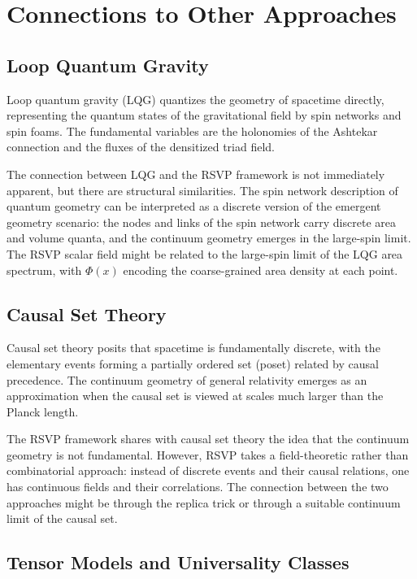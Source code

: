 \documentclass[12pt,a4paper,oneside]{book}
\theoremstyle{definition}
\theoremstyle{plain}
\theoremstyle{remark}
\begin{document}
\chapter{Connections to Other Approaches}

\section{Loop Quantum Gravity}

Loop quantum gravity (LQG) quantizes the geometry of spacetime directly,
representing the quantum states of the gravitational field by spin networks
and spin foams. The fundamental variables are the holonomies of the Ashtekar
connection and the fluxes of the densitized triad field.

The connection between LQG and the RSVP framework is not immediately apparent,
but there are structural similarities. The spin network description of quantum
geometry can be interpreted as a discrete version of the emergent geometry
scenario: the nodes and links of the spin network carry discrete area and
volume quanta, and the continuum geometry emerges in the large-spin limit.
The RSVP scalar field might be related to the large-spin limit of the LQG
area spectrum, with $\Phi(x)$ encoding the coarse-grained area density at
each point.

\section{Causal Set Theory}

Causal set theory posits that spacetime is fundamentally discrete, with
the elementary events forming a partially ordered set (poset) related by
causal precedence. The continuum geometry of general relativity emerges
as an approximation when the causal set is viewed at scales much larger
than the Planck length.

The RSVP framework shares with causal set theory the idea that the
continuum geometry is not fundamental. However, RSVP takes a field-theoretic
rather than combinatorial approach: instead of discrete events and their
causal relations, one has continuous fields and their correlations. The
connection between the two approaches might be through the replica trick
or through a suitable continuum limit of the causal set.

\section{Tensor Models and Universality Classes}
\end{document}
